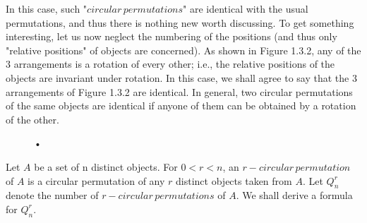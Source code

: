 \documentclass[a4paper,11pt]{book}
\begin{document}
In this case, such "$circular\, permutations$" are identical with the usual 
permutations, and thus there is nothing new worth discussing. To get 
something interesting, let us now neglect the numbering of the positions 
(and thus only "relative positions" of objects are concerned). As shown in 
Figure 1.3.2, any of the 3 arrangements is a rotation of every other; i.e., the 
relative positions of the objects are invariant under rotation. In this case, 
we shall agree to say that the 3 arrangements of Figure 1.3.2 are identical. 
In general, two circular permutations of the same objects are identical if 
anyone of them can be obtained by a rotation of the other. 
\begin{figure}[h]
\begin{center}
\caption{•}
\end{center}
\end{figure}

Let $A$ be a set of n distinct objects. For $0 < r < n$, an $r-circular\, 
permutation$ of $A$ is a circular permutation of any $r$ distinct objects taken from $A$. Let $Q_{n}^{r}$ denote the number of $r-circular\, permutations$ of $A$. We shall derive a formula for  $Q_{n}^{r}$.\\
\end{document}
